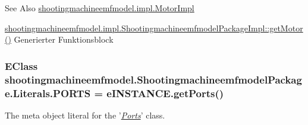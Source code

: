 \begin{DoxySeeAlso}{See Also}
\hyperlink{classshootingmachineemfmodel_1_1impl_1_1_motor_impl}{shootingmachineemfmodel.\-impl.\-Motor\-Impl} 

\hyperlink{classshootingmachineemfmodel_1_1impl_1_1_shootingmachineemfmodel_package_impl_a4821ab45885bc62267d5bb70879d0262}{shootingmachineemfmodel.\-impl.\-Shootingmachineemfmodel\-Package\-Impl\-::get\-Motor()} Generierter Funktionsblock 
\end{DoxySeeAlso}
\hypertarget{interfaceshootingmachineemfmodel_1_1_shootingmachineemfmodel_package_1_1_literals_a4a3e6c42963dc5b7edae879c0e1dddff}{
\subsubsection[{P\-O\-R\-T\-S}]{\setlength{\rightskip}{0pt plus 5cm}E\-Class shootingmachineemfmodel.\-Shootingmachineemfmodel\-Package.\-Literals.\-P\-O\-R\-T\-S = e\-I\-N\-S\-T\-A\-N\-C\-E.\-get\-Ports()}}\label{interfaceshootingmachineemfmodel_1_1_shootingmachineemfmodel_package_1_1_literals_a4a3e6c42963dc5b7edae879c0e1dddff}
The meta object literal for the '\hyperlink{classshootingmachineemfmodel_1_1impl_1_1_ports_impl}{{\itshape Ports}}' class.

